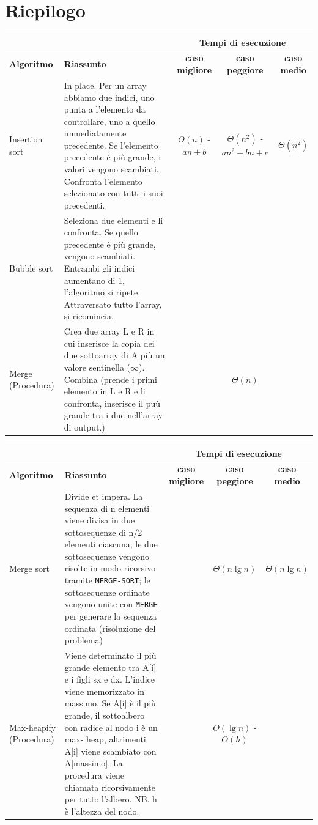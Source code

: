 \documentclass[11pt,a4paper]{article}
\begin{document}
\section{Riepilogo}
\begin{sideways}
  \begin{tabularx}{550pt}{l|X|c|c|c}
    \multicolumn{2}{c}{\ } & \multicolumn{3}{c}{\textbf{Tempi di esecuzione}}\\
    \hline
    \textbf{Algoritmo} & \textbf{Riassunto} & \textbf{caso migliore} & \textbf{caso peggiore} & \textbf{caso medio}\\
    \hline
    Insertion sort &
    In place. Per un array abbiamo due indici, uno
    punta a l’elemento da controllare, uno a
    quello immediatamente precedente. Se
    l’elemento precedente è più grande, i valori
    vengono scambiati. Confronta l’elemento
    selezionato con tutti i suoi precedenti. &
    $\Theta(n)$ -
    $an+b$ &
    $\Theta(n^2)$ -
    $an^2+bn+c$ &
    $\Theta(n^2)$ \\
    \hline
    Bubble sort &
    Seleziona due elementi e li confronta. Se
    quello precedente è più grande, vengono
    scambiati. Entrambi gli indici aumentano di 1,
    l’algoritmo si ripete. Attraversato tutto
    l’array, si ricomincia. & & \\
    \hline
    Merge (Procedura) &
    Crea due array L e R in cui inserisce la copia
    dei due sottoarray di A più un valore sentinella ($\infty$). Combina (prende i primi
    elemento in L e R e li confronta, inserisce il
    puù grande tra i due nell’array di output.)& &
    $\Theta(n)$
  \end{tabularx}
\end{sideways}

\begin{sideways}
  \begin{tabularx}{550pt}{l|X|c|c|c}
    \multicolumn{2}{c}{\ } & \multicolumn{3}{c}{\textbf{Tempi di esecuzione}}\\
    \hline
    \textbf{Algoritmo} & \textbf{Riassunto} & \textbf{caso migliore} & \textbf{caso peggiore} & \textbf{caso medio}\\
    \hline
    Merge sort &
    Divide et impera. La sequenza di n elementi
    viene divisa in due sottosequenze di n/2
    elementi ciascuna; le due sottosequenze
    vengono risolte in modo ricorsivo tramite
    \texttt{MERGE-SORT}; le sottosequenze ordinate
    vengono unite con \texttt{MERGE} per generare la
    sequenza ordinata (risoluzione del problema) & &
    $\Theta(n \lg n)$ &
    $\Theta(n \lg n)$ \\
    \hline
    Max-heapify (Procedura) &
    Viene determinato il più grande elemento tra
    A[i] e i figli sx e dx. L’indice viene memorizzato
    in massimo. Se A[i] è il più grande, il
    sottoalbero con radice al nodo i è un max-
    heap, altrimenti A[i] viene scambiato con
    A[massimo]. La procedura viene chiamata
    ricorsivamente per tutto l’albero. NB. h è l'altezza del nodo. & &
    $O(\lg n)$ - $O(h)$ \\
  \end{tabularx}
\end{sideways}
\end{document}
